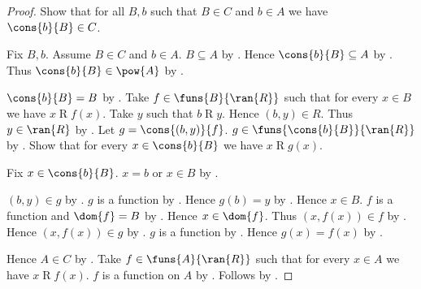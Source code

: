 \begin{proof}
    Show that for all $B,b$ such that $B\in C$ and $b\in A$ we have
        $\cons{b}{B}\in C$.
    \begin{subproof}
        Fix $B,b$.
        Assume $B\in C$ and $b\in A$.
        $B\subseteq A$ by .
        Hence $\cons{b}{B}\subseteq A$ by
            .
        Thus $\cons{b}{B}\in\pow{A}$ by .
        \begin{byCase}
            $\cons{b}{B}=B$ by .
            Take $f\in\funs{B}{\ran{R}}$ such that for every $x\in B$
                we have $x\mathrel{R}f(x)$.
            Take $y$ such that $b\mathrel{R}y$.
            Hence $(b,y)\in R$.
            Thus $y\in\ran{R}$ by .
            Let $g=\cons{(b,y)}{f}$.
            $g\in\funs{\cons{b}{B}}{\ran{R}}$ by
                .
            Show that for every $x\in\cons{b}{B}$ we have
                $x\mathrel{R}g(x)$.
            \begin{subproof}
                Fix $x\in\cons{b}{B}$.
                $x=b$ or $x\in B$ by .
                \begin{byCase}
                    $(b,y)\in g$ by .
                    $g$ is a function by .
                    Hence $g(b)=y$ by .
                    Hence $x\in B$.
                    $f$ is a function and $\dom{f}=B$ by
                        .
                    Hence $x\in\dom{f}$.
                    Thus $(x,f(x))\in f$ by
                        .
                    Hence $(x,f(x))\in g$ by .
                    $g$ is a function by .
                    Hence $g(x)=f(x)$ by
                        .
                \end{byCase}
            \end{subproof}
        \end{byCase}
    \end{subproof}

    Hence $A\in C$ by .
    Take $f\in\funs{A}{\ran{R}}$ such that for every $x\in A$ we have
        $x\mathrel{R}f(x)$.
    $f$ is a function on $A$ by .
    Follows by \auto.
\end{proof}
